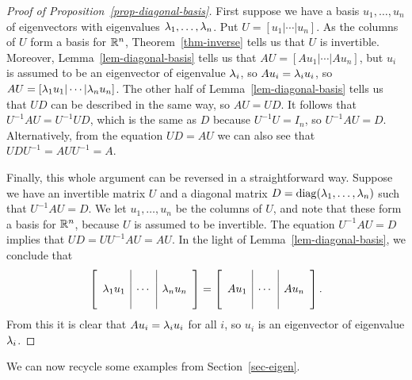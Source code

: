 \documentclass[reqno]{amsart}
\theoremstyle{definition}
\begin{document}
\begin{proof}[Proof of Proposition~\ref{prop-diagonal-basis}]
 First suppose we have a basis $u_1,\dotsc,u_n$ of eigenvectors with
 eigenvalues $\lambda_1,\dotsc,\lambda_n$.  Put $U=[u_1|\cdots|u_n]$.  As the
 columns of $U$ form a basis for ${\mathbb{R}}^n$, Theorem~\ref{thm-inverse}
 tells us that $U$ is invertible.  Moreover,
 Lemma~\ref{lem-diagonal-basis} tells us that $AU=[Au_1|\cdots|Au_n]$,
 but $u_i$ is assumed to be an eigenvector of eigenvalue $\lambda_i$, so
 $Au_i=\lambda_iu_i$, so $AU=[\lambda_1u_1|\cdots|\lambda_nu_n]$.  The other half
 of Lemma~\ref{lem-diagonal-basis} tells us that $UD$ can be described
 in the same way, so $AU=UD$.  It follows that $U^{-1}AU=U^{-1}UD$,
 which is the same as $D$ because $U^{-1}U=I_n$, so $U^{-1}AU=D$.
 Alternatively, from the equation $UD=AU$ we can also see that
 $UDU^{-1}=AUU^{-1}=A$. 

 Finally, this whole argument can be reversed in a straightforward
 way.  Suppose we have an invertible matrix $U$ and a diagonal matrix
 $D=\operatorname{diag}(\lambda_1,\dotsc,\lambda_n)$ such that $U^{-1}AU=D$.  We let
 $u_1,\dotsc,u_n$ be the columns of $U$, and note that these form a
 basis for ${\mathbb{R}}^n$, because $U$ is assumed to be invertible.  The
 equation $U^{-1}AU=D$ implies that $UD=UU^{-1}AU=AU$.  In the light
 of Lemma~\ref{lem-diagonal-basis}, we conclude that
 \[ 
  \left[\begin{array}{c|c|c}
   && \\ \lambda_1u_1 & \cdots & \lambda_nu_n \\ &&
  \end{array}\right]
  = 
  \left[\begin{array}{c|c|c}
   && \\ Au_1 & \cdots & Au_n \\ &&
  \end{array}\right].
 \]
 From this it is clear that $Au_i=\lambda_iu_i$ for all $i$, so $u_i$ is
 an eigenvector of eigenvalue $\lambda_i$.
\end{proof}

We can now recycle some examples from Section~\ref{sec-eigen}.
\end{document}
